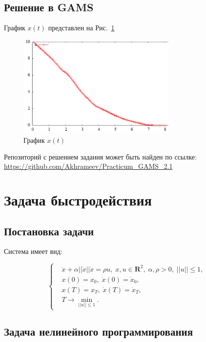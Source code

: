\documentclass[14pt]{article}
\begin{document}
\subsection{Решение в GAMS}

График $x(t)$ представлен на Рис.~\ref{x_t_task_2_1}

\begin{figure}[b!]
\centering
\includegraphics[width=0.7\textwidth]{x_t_task_2_1}
\caption{График $x(t)$}
\label{x_t_task_2_1}
\end{figure}

Репозиторий с решением задания может быть найден по ссылке:
\url{https://github.com/Akhrameev/Practicum_GAMS_2.1}

\newpage

\section{Задача быстродействия}
\subsection{Постановка задачи}

Система имеет вид:

\begin{equation}\label{syst2}
\left\{ \begin{aligned}
& \ddot{x}+\alpha||\dot{x}||\dot{x} = \rho u, \; x,u \in \textbf{R}^2, \; \alpha,\rho > 0,\;  ||u|| \le 1, \\
& x(0)=x_0, \; \dot{x}(0) = \dot{x}_0, \\
& x(T)=x_T, \; \dot{x}(T) = \dot{x}_T, \\
& T \rightarrow \min_{||u|| \le 1}.
\end{aligned}\right.
\end{equation}

\subsection{Задача нелинейного программирования}
\end{document}
